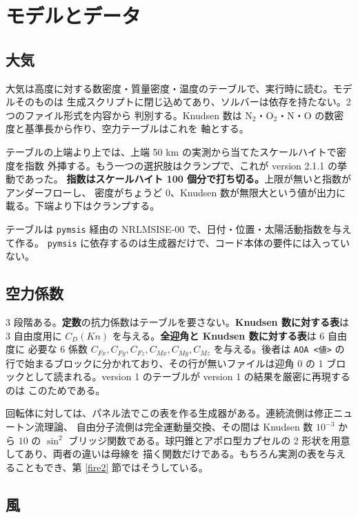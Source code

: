 \documentclass[11pt,a4paper,dvipdfmx]{jsarticle}
\begin{document}
\section{モデルとデータ}

\subsection{大気}

大気は高度に対する数密度・質量密度・温度のテーブルで、実行時に読む。モデルそのものは
生成スクリプトに閉じ込めてあり、ソルバーは依存を持たない。2 つのファイル形式を内容から
判別する。Knudsen 数は N$_2$・O$_2$・N・O の数密度と基準長から作り、空力テーブルはこれを
軸とする。

テーブルの上端より上では、上端 50 km の実測から当てたスケールハイトで密度を指数
外挿する。もう一つの選択肢はクランプで、これが version 2.1.1 の挙動であった。
\textbf{指数はスケールハイト 100 個分で打ち切る。}上限が無いと指数がアンダーフローし、
密度がちょうど 0、Knudsen 数が無限大という値が出力に載る。下端より下はクランプする。

テーブルは \texttt{pymsis} 経由の NRLMSISE-00 で、日付・位置・太陽活動指数を与えて作る。
\texttt{pymsis} に依存するのは生成器だけで、コード本体の要件には入っていない。

\subsection{空力係数}

3 段階ある。\textbf{定数}の抗力係数はテーブルを要さない。\textbf{Knudsen 数に対する表}は
3 自由度用に $C_D(Kn)$ を与える。\textbf{全迎角と Knudsen 数に対する表}は 6 自由度に
必要な 6 係数 $C_{Fx}, C_{Fy}, C_{Fz}, C_{Mx}, C_{My}, C_{Mz}$ を与える。後者は
\texttt{AOA <値>} の行で始まるブロックに分かれており、その行が無いファイルは迎角 0 の
1 ブロックとして読まれる。version 1 のテーブルが version 1 の結果を厳密に再現するのは
このためである。

回転体に対しては、パネル法でこの表を作る生成器がある。連続流側は修正ニュートン流理論、
自由分子流側は完全運動量交換、その間は Knudsen 数 $10^{-3}$ から $10$ の $\sin^2$
ブリッジ関数である。球円錐とアポロ型カプセルの 2 形状を用意してあり、両者の違いは母線を
描く関数だけである。もちろん実測の表を与えることもでき、第 \ref{fire2} 節ではそうしている。

\subsection{風}
\end{document}
